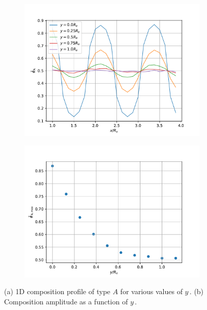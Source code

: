 \documentclass[bachelor,       %
               twoside,        %
               BCOR10mm,       %
               ngerman, english %
               ]{GAUBM}
\begin{document}
\begin{figure}[h]
  \centering
  \begin{subfigure}[b]{0.45\textwidth}
      \centering
      \includegraphics[width=\textwidth]{figures/amplitude_decay_profile.pdf}
      \caption{}
      \label{fig:amplitude_decay_profile}
  \end{subfigure}
    \hfill
  \begin{subfigure}[b]{0.45\textwidth}
      \centering
      \includegraphics[width=\textwidth]{figures/ampltitude_decay.pdf}
      \caption{}
      \label{fig:amplitude_decay}
  \end{subfigure}
     \caption{(a) 1D composition profile of type $A$ for various values of $y\,.$ (b) Composition amplitude as a function of $y\,.$}
     \label{fig:conversion_range_bulk}
\end{figure}
\end{document}

